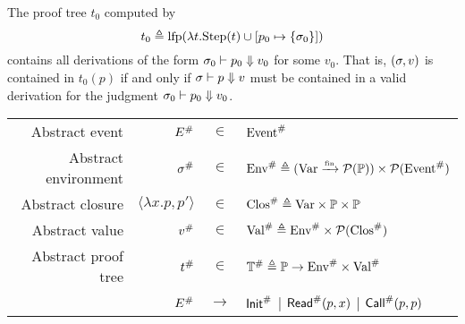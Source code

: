 \documentclass{article}
\begin{document}
The proof tree $t_0$ computed by
\[t_0\triangleq\text{lfp}(\lambda t.\text{Step}(t)\cup[p_0\mapsto\{\sigma_0\}])\]
contains all derivations of the form ${\sigma_0}\vdash{p_0}\Downarrow{v_0}$ for some $v_0$.
That is, $(\sigma,v)$ is contained in $t_0(p)$ if and only if ${\sigma}\vdash{p}\Downarrow{v}$ must be contained in a valid derivation for the judgment ${\sigma_0}\vdash{p_0}\Downarrow{v_0}$.
\begin{center}
  \begin{tabular}{rrcl}
    Abstract event       & ${E}^{\#}$                 & $\in$         & ${\text{Event}}^{\#}$                                                                     \\
    Abstract environment & ${\sigma}^{\#}$                   & $\in$         & ${\text{Env}}^{\#}\triangleq({\text{Var}}\xrightarrow{\mbox{\tiny{fin}}}{\mathcal{P}(\mathbb{P})})\times\mathcal{P}({\text{Event}}^{\#})$ \\
    Abstract closure     & $\langle\lambda x.p,p'\rangle$ & $\in$         & ${\text{Clos}}^{\#}\triangleq\text{Var}\times\mathbb{P}\times\mathbb{P}$              \\
    Abstract value       & ${v}^{\#}$                      & $\in$         & ${\text{Val}}^{\#}\triangleq{\text{Env}}^{\#}\times\mathcal{P}({\text{Clos}}^{\#})$                   \\
    Abstract proof tree  & ${t}^{\#}$                      & $\in$         & ${\mathbb{T}}^{\#}\triangleq\mathbb{P}\rightarrow{\text{Env}}^{\#}\times{\text{Val}}^{\#}$      \\
                         & ${E}^{\#}$                 & $\rightarrow$ & ${\textsf{Init}}^{\#}$ | ${\textsf{Read}}^{\#}(p,x)$ | ${\textsf{Call}}^{\#}(p,p)$
  \end{tabular}
\end{center}
\end{document}
